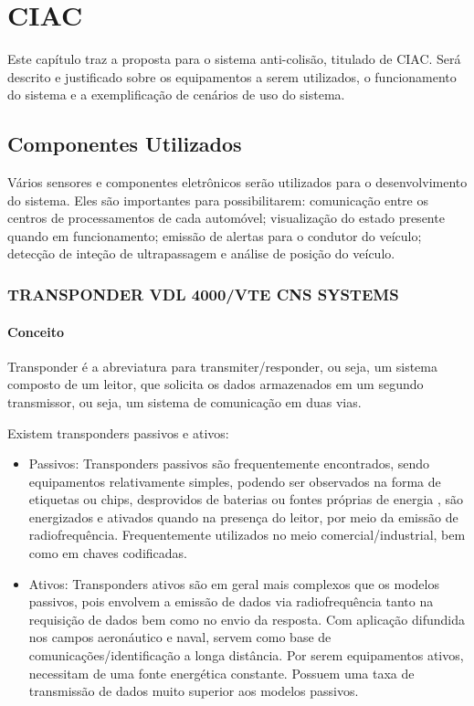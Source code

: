 \chapter[CIAC]{CIAC}
Este capítulo traz a proposta para o sistema anti-colisão, titulado de CIAC.
Será descrito e justificado sobre os equipamentos a serem utilizados, o funcionamento
do sistema e a exemplificação de cenários de uso do sistema.

\section{Componentes Utilizados}

Vários sensores e componentes eletrônicos serão utilizados para o desenvolvimento
do sistema. Eles são importantes para possibilitarem: comunicação entre
os centros de processamentos de cada automóvel; visualização do estado presente
quando em funcionamento; emissão de alertas para o condutor do veículo; detecção
de inteção de ultrapassagem e análise de posição do veículo.

\subsection{TRANSPONDER VDL 4000/VTE CNS SYSTEMS}

\subsubsection{Conceito}
Transponder é a abreviatura para transmiter/responder, ou seja, um sistema
composto de um leitor, que solicita os dados armazenados em um segundo
transmissor, ou seja, um sistema de comunicação em duas vias.

Existem transponders passivos e ativos:

\begin{itemize}
  \item Passivos: Transponders passivos são frequentemente encontrados,
  sendo equipamentos relativamente simples, podendo ser observados na forma
  de etiquetas ou chips, desprovidos de baterias ou fontes próprias de energia
  , são energizados e ativados quando na presença do leitor, por meio da
   emissão de radiofrequência. Frequentemente utilizados no meio
   comercial/industrial, bem como em chaves codificadas.
  \item Ativos: Transponders ativos são em geral mais complexos que os
  modelos passivos, pois envolvem a emissão de dados via radiofrequência
  tanto na requisição de dados bem como no envio da resposta. Com aplicação
  difundida nos campos aeronáutico e naval, servem como base de
  comunicações/identificação a longa distância. Por serem equipamentos ativos,
  necessitam de uma fonte energética constante. Possuem uma taxa de
  transmissão de dados muito superior aos modelos passivos.
\end{itemize}

